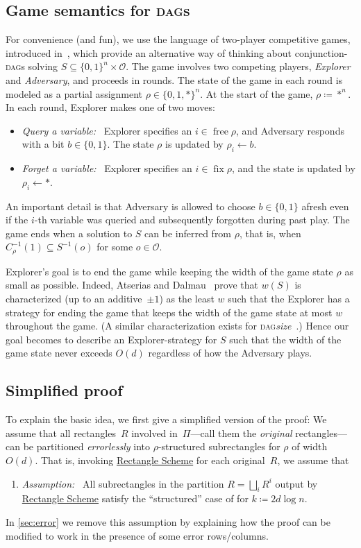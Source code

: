 \documentclass{toc}
\newcommand{\rectlemma}{\expref{Lemma}{lem:scheme}\xspace}%
\newcommand{\rectscheme}{\hyperref[alg:partition]{Rectangle Scheme}\xspace}
\DeclareMathOperator{\free}{free}
\DeclareMathOperator{\fix}{fix}
\newcommand{\DAGs}{\textsc{dag}s\xspace}
\newcommand{\DAGspace}{\textsc{dag}\xspace}
\newcommand{\calO}{\mathcal{O}}
\begin{document}
\subsection{Game semantics for \DAGs}
For convenience (and fun), we use the language of two-player competitive games, introduced in~\cite{pudlak00proofs,atserias08combinatorial}, which provide an alternative way of thinking about conjunction-\DAGs solving $S\subseteq\{0,1\}^n\times \calO$. The game involves two competing players, \emph{Explorer} and \emph{Adversary}, and proceeds in rounds. The state of the game in each round is modeled as a partial assignment $\rho\in\{0,1,*\}^n$. At the start of the game, $\rho\coloneqq *^n$. In each round, Explorer makes one of two moves:
\begin{itemize}
\item \emph{Query a variable:}~ Explorer specifies an $i\in\free\rho$, and Adversary responds with a bit $b\in\{0,1\}$. The state $\rho$ is updated by $\rho_i \leftarrow b$.
\item \emph{Forget a variable:}~ Explorer specifies an $i\in\fix\rho$, and the state is updated by $\rho_i\leftarrow *$.
\end{itemize}
An important detail is that Adversary is allowed to choose $b\in\{0,1\}$ afresh even if the $i$-th variable was queried and subsequently forgotten during past play. The game ends when a solution to $S$ can be inferred from $\rho$, that is, when $C_\rho^{-1}(1)\subseteq S^{-1}(o)$ for some $o\in \calO$.

Explorer's goal is to end the game while keeping the width of the game state $\rho$ as small as possible. Indeed, Atserias and Dalmau~\cite{atserias08combinatorial} prove that $w(S)$ is characterized (up to an additive~$\pm 1$) as the least $w$ such that the Explorer has a strategy for ending the game that keeps the width of the game state at most $w$ throughout the game. (A similar characterization exists for \DAGspace \emph{size}~\cite{pudlak00proofs}.) Hence our goal becomes to describe an Explorer-strategy for $S$ such that the width of the game state never exceeds $O(d)$ regardless of how the Adversary plays.

\subsection{Simplified proof} \label{sec:simple-proof}

To explain the basic idea, we first give a simplified version of the proof: We assume that all rectangles~$R$ involved in~$\Pi$---call them the \emph{original} rectangles---can be partitioned \emph{errorlessly} into $\rho$-structured subrectangles for $\rho$ of width $O(d)$. That is, invoking \rectscheme for each original~$R$, we assume that
\begin{enumerate}[label=($\bm{*}$)]
\item \label{assumption}
\emph{Assumption:}~ All subrectangles in the partition $R=\bigsqcup_i R^i$ output by \rectscheme satisfy the ``structured'' case of \rectlemma for $k\coloneqq 2d\log n$.
\end{enumerate}
In \autoref{sec:error} we remove this assumption by explaining how the proof can be modified to work in the presence of some error rows/columns.
\end{document}
